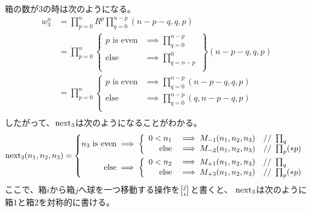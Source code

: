 	箱の数が$3$の時は次のようになる。
	\begin{equation*}\begin{split} %
		w_3^n &= \prod_{p=0}^nR^p\prod_{q=0}^{n-p}(n-p-q,q,p) \\
		&= \prod_{p=0}^n \left\{\begin{split}
			p\text{ is even} &\implies \prod_{q=0}^{n-p} \\
			\text{else} &\implies \prod_{q=n-p}^{0} \\
		\end{split}\right\}(n-p-q,q,p) \\  %
		&= \prod_{p=0}^n \left\{\begin{split}
			p\text{ is even} &\implies \prod_{q=0}^{n-p} (n-p-q,q,p) \\
			\text{else} &\implies \prod_{q=0}^{n-p} (q,n-p-q,p) \\
		\end{split}\right. \\ %
	\end{split}\end{equation*} %
	したがって、$\operatorname{next}_3$は次のようになることがわかる。
	\begin{equation*}\begin{split} %
		\myop{next}_3(n_1,n_2,n_3) = \left\{\begin{split}
			n_3\text{ is even} &\implies \left\{\begin{array}{rll}
				0< n_1 &\implies M_{-1}(n_1,n_2,n_3) &\text{// }\prod_q \\
				\text{else} &\implies M_{-2}(n_1,n_2,n_3) &\text{// }\prod_p(*p) \\
			\end{array}\right. \\ %
			\text{else} &\implies \left\{\begin{array}{rll}
				0< n_2 &\implies M_{+1}(n_1,n_2,n_3) &\text{// }\prod_q \\
				\text{else} &\implies M_{+3}(n_1,n_2,n_3) &\text{// }\prod_p(*p) \\
			\end{array}\right. \\ %
		\end{split}\right. \\ %
	\end{split}\end{equation*} %
	ここで、箱$i$から箱$j$へ球を一つ移動する操作を$\move{j}{i}$と書くと、
	$\operatorname{next}_3$は次のように箱$1$と箱$2$を対称的に書ける。
